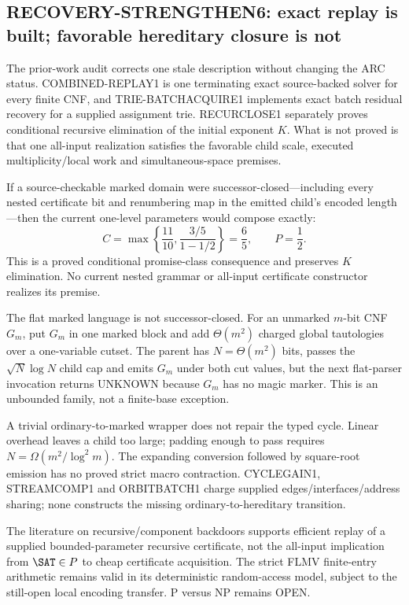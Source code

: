 \subsection*{RECOVERY-STRENGTHEN6: exact replay is built; favorable hereditary closure is not}

The prior-work audit corrects one stale description without changing the ARC
status.  COMBINED-REPLAY1 is one terminating exact source-backed solver for
every finite CNF, and TRIE-BATCHACQUIRE1 implements exact batch residual
recovery for a supplied assignment trie.  RECURCLOSE1 separately proves
conditional recursive elimination of the initial exponent $K$.  What is not
proved is that one all-input realization satisfies the favorable child scale,
executed multiplicity/local work and simultaneous-space premises.

If a source-checkable marked domain were successor-closed---including every
nested certificate bit and renumbering map in the emitted child's encoded
length---then the current one-level parameters would compose exactly:
\[
 C=\max\left\{\frac{11}{10},
   \frac{3/5}{1-1/2}\right\}=\frac65,
 \qquad P=\frac12.
\]
This is a proved conditional promise-class consequence and preserves
$K$ elimination.  No current nested grammar or all-input certificate
constructor realizes its premise.

The flat marked language is not successor-closed.  For an unmarked $m$-bit
CNF $G_m$, put $G_m$ in one marked block and add $\Theta(m^2)$ charged global
tautologies over a one-variable cutset.  The parent has $N=\Theta(m^2)$ bits,
passes the $\sqrt N\log N$ child cap and emits $G_m$ under both cut values,
but the next flat-parser invocation returns UNKNOWN because $G_m$ has no
magic marker.  This is an unbounded family, not a finite-base exception.

A trivial ordinary-to-marked wrapper does not repair the typed cycle.  Linear
overhead leaves a child too large; padding enough to pass requires
$N=\Omega(m^2/\log^2m)$.  The expanding conversion followed by square-root
emission has no proved strict macro contraction.  CYCLEGAIN1, STREAMCOMP1 and
ORBITBATCH1 charge supplied edges/interfaces/address sharing; none constructs
the missing ordinary-to-hereditary transition.

The literature on recursive/component backdoors supports efficient replay of
a supplied bounded-parameter recursive certificate, not the all-input
implication from $\SAT\in P$ to cheap certificate acquisition.  The strict
FLMV finite-entry arithmetic remains valid in its deterministic random-access
model, subject to the still-open local encoding transfer.  P versus NP remains
OPEN.

